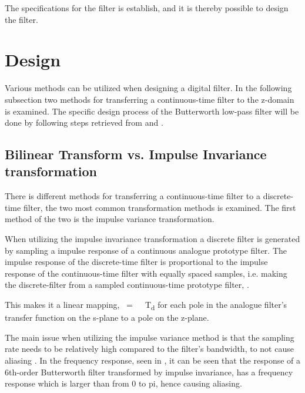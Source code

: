 The specifications for the filter is establish, and it is thereby possible to design the filter.

\section{Design}
Various methods can be utilized when designing a digital filter. In the following subsection two methods for transferring a continuous-time filter to the z-domain is examined. The specific design process of the Butterworth low-pass filter will be done by following steps retrieved from \cite{AVOppenheim} and \cite{OvesSlides}.

\subsection{Bilinear Transform vs. Impulse Invariance transformation}
There is different methods for transferring a continuous-time filter to a discrete-time filter, the two most common transformation methods is examined. The first method of the two is the impulse variance transformation.

When utilizing the impulse invariance transformation a discrete filter is generated by sampling a impulse response of a continuous analogue prototype filter. The impulse response of the discrete-time filter is proportional to the impulse response of the continuous-time filter with equally spaced samples, i.e.  making the discrete-filter from a sampled continuous-time prototype filter, \cite{AVOppenheim}.

This makes it a linear mapping, \si{\omega = \Omega \cdot T_d} for each pole in the analogue filter's transfer function on the s-plane to a pole on the z-plane. 

The main issue when utilizing the impulse variance method is that the sampling rate needs to be relatively high compared to the filter's bandwidth, to not cause aliasing \cite{LyonsR.G}. In the frequency response, seen in , it can be seen that the response of a 6th-order Butterworth filter transformed by impulse invariance, has a frequency response which is larger than from 0 to \si{pi}, hence causing aliasing.

